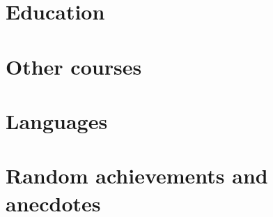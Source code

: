 \documentclass[11pt,a4paper,sans]{moderncv}
\begin{document}
\clearpage

\section{Education}







\section{Other courses}




\section{Languages}



\clearpage

\section{Random achievements and anecdotes}
\end{document}
